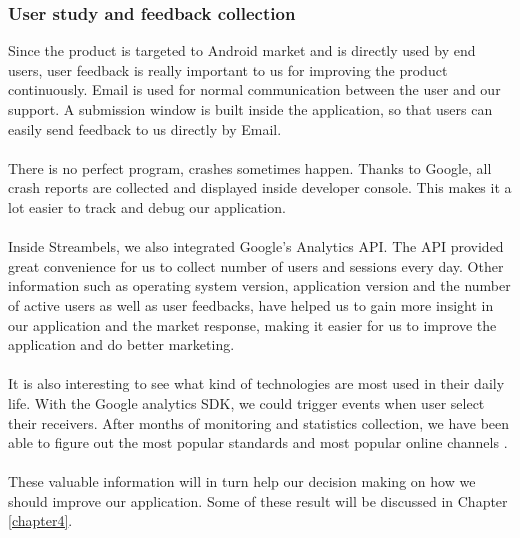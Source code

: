 \subsubsection{User study and feedback collection\label{3_7_2}}
Since the product is targeted to Android market and is directly used by end users, user feedback is really important to us for improving the product continuously. Email is used for normal communication between the user and our support. A submission window is built inside the application, so that users can easily send feedback to us directly by Email.\\
\\
There is no perfect program, crashes sometimes happen. Thanks to Google, all crash reports are collected and displayed inside developer console. This makes it a lot easier to track and debug our application.\\
\\
Inside Streambels, we also integrated Google's Analytics API. The API provided great convenience for us to collect number of users and sessions every day. Other information such as operating system version, application version and the number of active users as well as user feedbacks, have helped us to gain more insight in our application and the market response, making it easier for us to improve the application and do better marketing.\\ 
\\
It is also interesting to see what kind of technologies are most used in their daily life. With the Google analytics SDK, we could trigger events when user select their receivers. After months of monitoring and statistics collection, we have been able to figure out the most popular standards and most popular online channels .\\
\\
These valuable information will in turn help our decision making on how we should improve our application. Some of these result will be discussed in Chapter \ref{chapter4}.